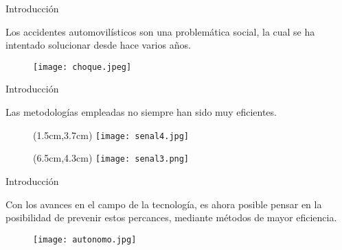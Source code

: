 \documentclass[14pt]{beamer}
\begin{document}
\begin{frame}{Introducción}

Los accidentes automovilísticos son una problemática social, la cual se ha intentado solucionar desde hace varios años.

\begin{figure}[H]
\texttt{[image: choque.jpeg]}
\end{figure}

\end{frame}



\begin{frame}{Introducción}

Las metodologías empleadas no siempre han sido muy eficientes.
\vspace{3.5cm}
\begin{figure}[H]
\begin{textblock*}{6cm}(1.5cm,3.7cm)
\texttt{[image: senal4.jpg]}
\end{textblock*}
\end{figure}
\begin{figure}[H]
\begin{textblock*}{6cm}(6.5cm,4.3cm)
\texttt{[image: senal3.png]}
\end{textblock*}
\end{figure}

\end{frame}



\begin{frame}{Introducción}

Con los avances en el campo de la tecnología, es ahora posible pensar en la posibilidad de prevenir estos percances, mediante métodos de mayor eficiencia.

\begin{figure}[H]
\texttt{[image: autonomo.jpg]}
\end{figure}

\end{frame}
\end{document}
